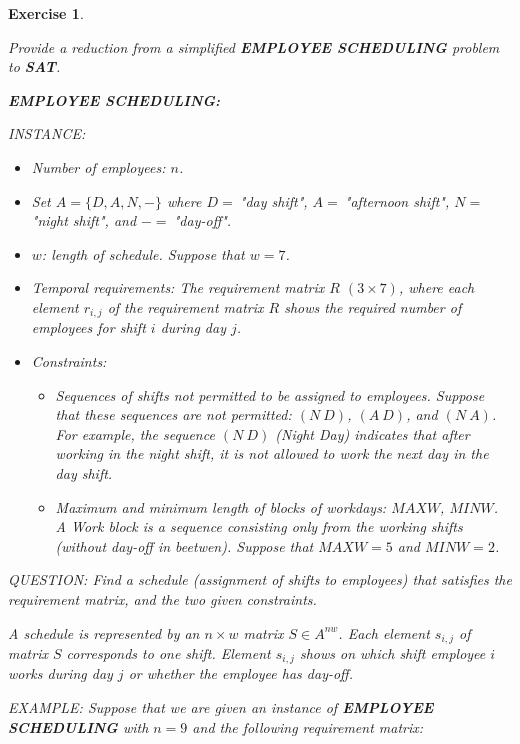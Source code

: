 \documentclass [11pt]{article}
\newtheorem{exercise}[theorem]{Exercise}
\begin{document}
\begin{exercise}
  \label{ex:Scheduling}
  
  Provide a reduction from a simplified \textbf{EMPLOYEE SCHEDULING}  problem to \textbf{SAT}. 
  
 
  \medskip     
  
  
\noindent \textbf{EMPLOYEE SCHEDULING:}     

\noindent
INSTANCE:
\begin{itemize}
\item {Number of employees: $n$.}
\item {Set $A = \{D,A,N,-\}$ where $D =\ $"day shift", $A =\ $"afternoon shift", $N =\ $"night shift", and $- =\ $"day-off". }
\item {$w$: length of schedule. Suppose that $w=7$.}
\item {Temporal requirements: The requirement matrix $R$ $(3\times 7)$, where each element $r_{i,j}$ of the requirement matrix $R$ shows the required number of employees for shift $i$ during day $j$.}




\item {Constraints: 

\begin{itemize}
\item{Sequences of shifts not permitted to be assigned to employees. Suppose that these sequences are not permitted: $(N\ D)$, $(A\ D)$, and  $(N\ A)$. For example, the sequence $(N\ D)$ (Night Day) indicates that after working in the night shift, it is not allowed to work the next day in the day shift. }

\item{Maximum and minimum length of blocks of workdays: 
${MAXW}$, ${MINW}$. A Work block is a sequence consisting only from the working shifts (without day-off in beetwen). Suppose that $MAXW=5$ and $MINW=2$.}
\end{itemize}}
\end{itemize}

\noindent
QUESTION: Find a schedule (assignment of shifts to employees) that satisfies the requirement matrix, and the two given constraints. 

\medskip
\noindent
A schedule is represented by an $n\times w$ matrix $S\in A^{nw}$. Each element $s_{i,j}$ of matrix $S$ corresponds to one shift. Element $s_{i,j}$ shows on which shift employee $i$ works during day $j$ or whether the employee has day-off.

 
\medskip 
\noindent
EXAMPLE: Suppose that we are given an instance of \textbf{EMPLOYEE SCHEDULING} with $n=9$ and the following requirement matrix:


\end{exercise}
\end{document}
